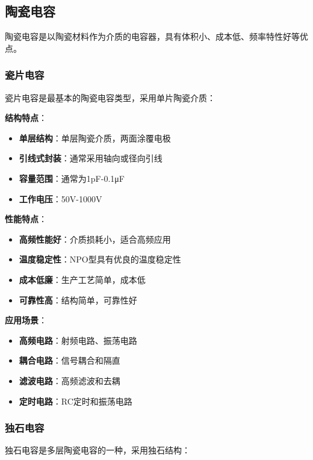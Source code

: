 \documentclass[12pt,UTF8]{ctexbook}
\begin{document}
\subsection{陶瓷电容}

陶瓷电容是以陶瓷材料作为介质的电容器，具有体积小、成本低、频率特性好等优点。

\subsubsection{瓷片电容}

瓷片电容是最基本的陶瓷电容类型，采用单片陶瓷介质：

\textbf{结构特点}：
\begin{itemize}[leftmargin=3.5em]
    \item \textbf{单层结构}：单层陶瓷介质，两面涂覆电极
    \item \textbf{引线式封装}：通常采用轴向或径向引线
    \item \textbf{容量范围}：通常为1pF-0.1μF
    \item \textbf{工作电压}：50V-1000V
\end{itemize}

\textbf{性能特点}：
\begin{itemize}[leftmargin=3.5em]
    \item \textbf{高频性能好}：介质损耗小，适合高频应用
    \item \textbf{温度稳定性}：NPO型具有优良的温度稳定性
    \item \textbf{成本低廉}：生产工艺简单，成本低
    \item \textbf{可靠性高}：结构简单，可靠性好
\end{itemize}

\textbf{应用场景}：
\begin{itemize}[leftmargin=3.5em]
    \item \textbf{高频电路}：射频电路、振荡电路
    \item \textbf{耦合电路}：信号耦合和隔直
    \item \textbf{滤波电路}：高频滤波和去耦
    \item \textbf{定时电路}：RC定时和振荡电路
\end{itemize}

\subsubsection{独石电容}

独石电容是多层陶瓷电容的一种，采用独石结构：
\end{document}
